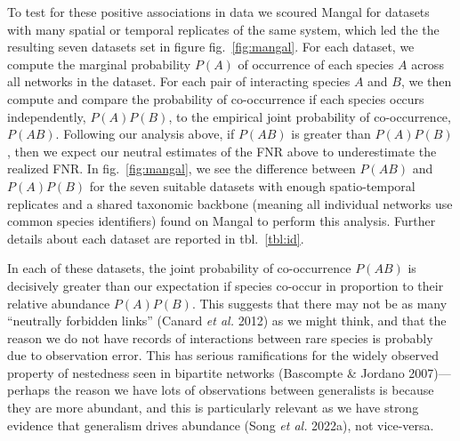 \documentclass[10pt,oneside]{article}
\begin{document}
To test for these positive associations in data we scoured Mangal for
datasets with many spatial or temporal replicates of the same system,
which led the the resulting seven datasets set in figure
fig.~\ref{fig:mangal}. For each dataset, we compute the marginal
probability \(P(A)\) of occurrence of each species \(A\) across all
networks in the dataset. For each pair of interacting species \(A\) and
\(B\), we then compute and compare the probability of co-occurrence if
each species occurs independently, \(P(A)P(B)\), to the empirical joint
probability of co-occurrence, \(P(AB)\). Following our analysis above,
if \(P(AB)\) is greater than \(P(A)P(B)\), then we expect our neutral
estimates of the FNR above to underestimate the realized FNR. In
fig.~\ref{fig:mangal}, we see the difference between \(P(AB)\) and
\(P(A)P(B)\) for the seven suitable datasets with enough spatio-temporal
replicates and a shared taxonomic backbone (meaning all individual
networks use common species identifiers) found on Mangal to perform this
analysis. Further details about each dataset are reported in
tbl.~\ref{tbl:id}.

In each of these datasets, the joint probability of co-occurrence
\(P(AB)\) is decisively greater than our expectation if species co-occur
in proportion to their relative abundance \(P(A)P(B)\). This suggests
that there may not be as many ``neutrally forbidden links'' (Canard
\emph{et al.} 2012) as we might think, and that the reason we do not
have records of interactions between rare species is probably due to
observation error. This has serious ramifications for the widely
observed property of nestedness seen in bipartite networks (Bascompte \&
Jordano 2007)---perhaps the reason we have lots of observations between
generalists is because they are more abundant, and this is particularly
relevant as we have strong evidence that generalism drives abundance
(Song \emph{et al.} 2022a), not vice-versa.
\end{document}
